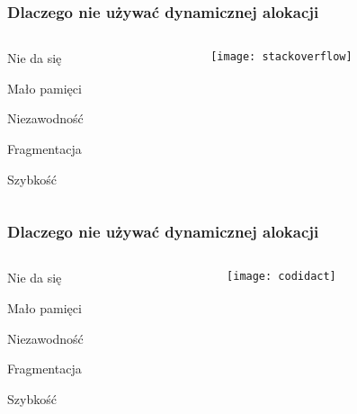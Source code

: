 \documentclass{beamer}
\makeatletter
\newenvironment{myitemize}{%
   \setlength{\topsep}{0pt}
   \setlength{\partopsep}{0pt}
   \renewcommand*{\@listi}{\leftmargin\leftmargini \parsep\z@ \topsep\z@ \itemsep\z@}
   \let\@listI\@listi
   \itemize
}{\enditemize}
\makeatother
\begin{document}
\begin{frame}[t]
    \frametitle{Dlaczego nie używać dynamicznej alokacji}

    \begin{columns}[t]
        \begin{column}[t]{0.35\textwidth}
            \begin{myitemize}
                \item Nie da się
                \item Mało pamięci
                \item Niezawodność
                \item Fragmentacja
                \item Szybkość
            \end{myitemize}
        \end{column}
        \begin{column}[t]{0.7\textwidth}
            \begin{center}
                \texttt{[image: stackoverflow]}\\
                \tiny \cite{stackoverflow} 
            \end{center}
        \end{column}
    \end{columns}
\end{frame}
\begin{frame}[t]
    \frametitle{Dlaczego nie używać dynamicznej alokacji}

    \begin{columns}[t]
        \begin{column}[t]{0.35\textwidth}
            \begin{myitemize}
                \item Nie da się
                \item Mało pamięci
                \item Niezawodność
                \item Fragmentacja
                \item Szybkość
            \end{myitemize}
        \end{column}
        \begin{column}[t]{0.7\textwidth}
            \begin{center}
                \texttt{[image: codidact]}\\
                \tiny \cite{codidact} 
            \end{center}
        \end{column}
    \end{columns}
\end{frame}
\end{document}
